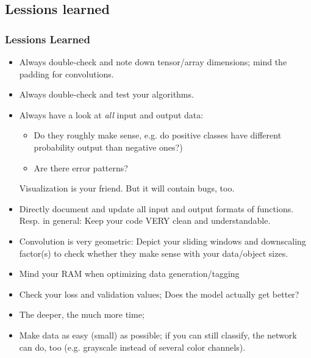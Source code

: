 \subsection{Lessions learned}
\begin{frame}[allowframebreaks]
  \frametitle<presentation>{Lessions Learned}
  \begin{itemize}
  \item Always double-check and note down tensor/array dimensions;
    mind the padding for convolutions.
  \item Always double-check and test your algorithms.
  \item Always have a look at \emph{all} input and output data:
    \begin{itemize}
    \item Do they roughly make sense, e.g. do positive classes have
      different probability output than negative ones?)
    \item Are there error patterns?
    \end{itemize}
    Visualization is your friend. But it will contain bugs, too.
  \item Directly document and update all input and output formats of
    functions. Resp. in general: Keep your code VERY clean and understandable.
  \item Convolution is very geometric: Depict your sliding windows and
    downscaling factor(s) to check whether they make sense with your
    data/object sizes.
  \item Mind your RAM when optimizing data generation/tagging
  \item Check your loss and validation values; Does the model actually
    get better?
  \item The deeper, the much more time;
  \item Make data as easy (small) as possible; if you can still
    classify, the network can do, too (e.g. grayscale instead of several
    color channels).
  \end{itemize}
\end{frame}

\nocite{*}
\printbibliography[heading=none]



